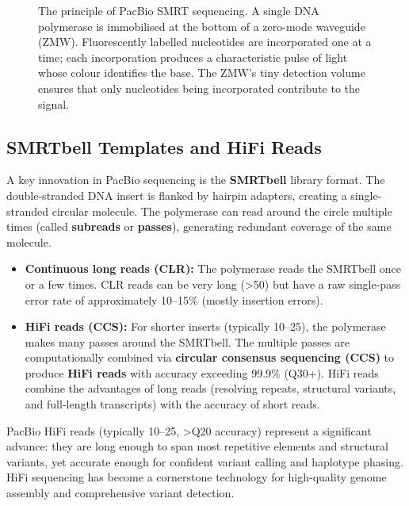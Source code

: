 \begin{figure}[htbp]
\caption[SMRT sequencing principle.]{The principle of PacBio SMRT sequencing. A single DNA polymerase is immobilised at the bottom of a zero-mode waveguide (ZMW). Fluorescently labelled nucleotides are incorporated one at a time; each incorporation produces a characteristic pulse of light whose colour identifies the base. The ZMW's tiny detection volume ensures that only nucleotides being incorporated contribute to the signal.}
\label{fig:seqprinciples:smrt}
\end{figure}

\subsection{SMRTbell Templates and HiFi Reads}
\label{subsec:seqprinciples:smrtbell}

A key innovation in PacBio sequencing is the \textbf{SMRTbell} library format. The double-stranded DNA insert is flanked by hairpin adapters, creating a single-stranded circular molecule. The polymerase can read around the circle multiple times (called \textbf{subreads} or \textbf{passes}), generating redundant coverage of the same molecule.

\begin{itemize}[itemsep=2pt]
  \item \textbf{Continuous long reads (CLR):} The polymerase reads the SMRTbell once or a few times. CLR reads can be very long (>50\kilobase{}) but have a raw single-pass error rate of approximately 10--15\% (mostly insertion errors).
  \item \textbf{HiFi reads (CCS):} For shorter inserts (typically 10--25\kilobase{}), the polymerase makes many passes around the SMRTbell. The multiple passes are computationally combined via \textbf{circular consensus sequencing (CCS)} to produce \textbf{HiFi reads} with accuracy exceeding 99.9\% (Q30+). HiFi reads combine the advantages of long reads (resolving repeats, structural variants, and full-length transcripts) with the accuracy of short reads.
\end{itemize}

\begin{keyconcept}[title={HiFi Reads: The Best of Both Worlds}]
PacBio HiFi reads (typically 10--25\kilobase{}, >Q20 accuracy) represent a significant advance: they are long enough to span most repetitive elements and structural variants, yet accurate enough for confident variant calling and haplotype phasing. HiFi sequencing has become a cornerstone technology for high-quality genome assembly and comprehensive variant detection.
\end{keyconcept}


